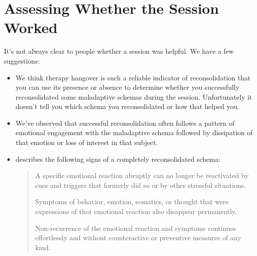 \documentclass[12pt,letterpaper]{book}
\begin{document}
\section{Assessing Whether the Session Worked}
It's not always clear to people whether a session was helpful. We have a few suggestions:
\begin{itemize}
    \item We think therapy hangover is such a reliable indicator of reconsolidation that you can use its presence or absence to determine whether you successfully reconsolidated some maladaptive schemas during the session. Unfortunately it doesn't tell you which schema you reconsolidated or how that helped you.
    \item We've observed that successful reconsolidation often follows a pattern of emotional engagement with the maladaptive schema followed by dissipation of that emotion or loss of interest in that subject.
    \item \textcite{eckerUnlocking} describes the following signs of a completely reconsolidated schema:
    \begin{quotation}
        A specific emotional reaction abruptly can no longer be reactivated by cues and triggers that formerly did so or by other stressful situations.
        
        Symptoms of behavior, emotion, somatics, or thought that were expressions of that emotional reaction also disappear permanently.
        
        Non-recurrence of the emotional reaction and symptoms continues effortlessly and without counteractive or preventive measures of any kind.
    \end{quotation}
\end{itemize}
\end{document}
